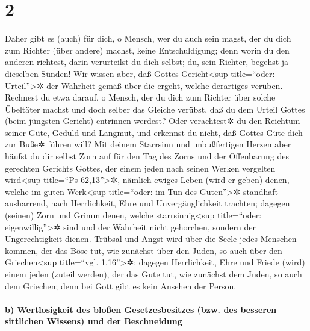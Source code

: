 \hypertarget{section-1}{%
\section{2}\label{section-1}}

 Daher gibt es (auch) für dich, o Mensch, wer du auch sein
magst, der du dich zum Richter (über andere) machst, keine
Entschuldigung; denn worin du den anderen richtest, darin verurteilst du
dich selbst; du, sein Richter, begehst ja dieselben Sünden!
 Wir wissen aber, daß Gottes Gericht\textless sup
title=``oder: Urteil''\textgreater✲ der Wahrheit gemäß über die ergeht,
welche derartiges verüben.  Rechnest du etwa darauf, o
Mensch, der du dich zum Richter über solche Übeltäter machst und doch
selber das Gleiche verübst, daß du dem Urteil Gottes (beim jüngsten
Gericht) entrinnen werdest?  Oder verachtest✲ du den
Reichtum seiner Güte, Geduld und Langmut, und erkennst du nicht, daß
Gottes Güte dich zur Buße✲ führen will?  Mit deinem
Starrsinn und unbußfertigen Herzen aber häufst du dir selbst Zorn auf
für den Tag des Zorns und der Offenbarung des gerechten Gerichts Gottes,
 der einem jeden nach seinen Werken vergelten
wird\textless sup title=``Ps 62,13''\textgreater✲, 
nämlich ewiges Leben (wird er geben) denen, welche im guten
Werk\textless sup title=``oder: im Tun des Guten''\textgreater✲
standhaft ausharrend, nach Herrlichkeit, Ehre und Unvergänglichkeit
trachten;  dagegen (seinen) Zorn und Grimm denen, welche
starrsinnig\textless sup title=``oder: eigenwillig''\textgreater✲ sind
und der Wahrheit nicht gehorchen, sondern der Ungerechtigkeit dienen.
 Trübsal und Angst wird über die Seele jedes Menschen
kommen, der das Böse tut, wie zunächst über den Juden, so auch über den
Griechen\textless sup title=``vgl. 1,16''\textgreater✲; 
dagegen Herrlichkeit, Ehre und Friede (wird) einem jeden (zuteil
werden), der das Gute tut, wie zunächst dem Juden, so auch dem Griechen;
 denn bei Gott gibt es kein Ansehen der Person.

\hypertarget{b-wertlosigkeit-des-blouxdfen-gesetzesbesitzes-bzw.-des-besseren-sittlichen-wissens-und-der-beschneidung}{%
\paragraph{b) Wertlosigkeit des bloßen Gesetzesbesitzes (bzw. des
besseren sittlichen Wissens) und der
Beschneidung}\label{b-wertlosigkeit-des-blouxdfen-gesetzesbesitzes-bzw.-des-besseren-sittlichen-wissens-und-der-beschneidung}}

